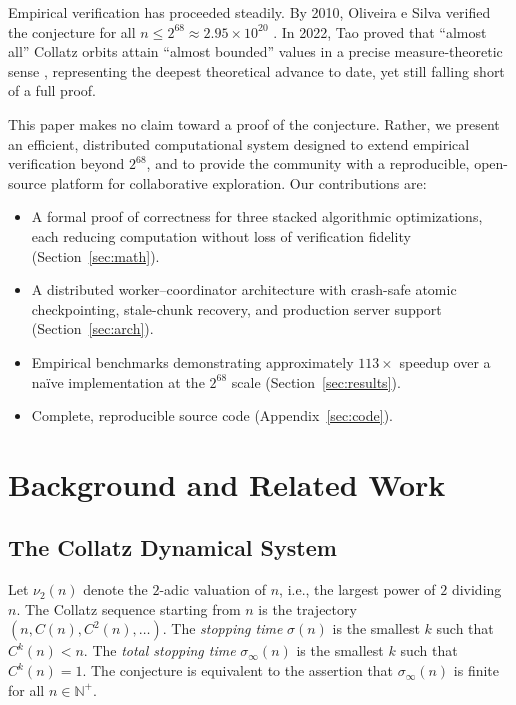 \documentclass{mcom-l}
\theoremstyle{definition}
\theoremstyle{remark}
\numberwithin{equation}{section}
\newcommand{\N}{\mathbb{N}}          %
\newcommand{\vp}{\nu_2}              %
\begin{document}
Empirical verification has proceeded steadily.  By 2010, Oliveira e
Silva verified the conjecture for all $n \leq 2^{68} \approx 2.95
\times 10^{20}$ \cite{OliveiraeSilva2010}.  In 2022, Tao proved that
``almost all'' Collatz orbits attain ``almost bounded'' values in a
precise measure-theoretic sense \cite{Tao2022}, representing the
deepest theoretical advance to date, yet still falling short of a full
proof.

This paper makes no claim toward a proof of the conjecture.  Rather,
we present an efficient, distributed computational system designed to
extend empirical verification beyond $2^{68}$, and to provide the
community with a reproducible, open-source platform for collaborative
exploration.  Our contributions are:
\begin{itemize}
  \item A formal proof of correctness for three stacked algorithmic
        optimizations, each reducing computation without loss of
        verification fidelity (Section~\ref{sec:math}).
  \item A distributed worker--coordinator architecture with crash-safe
        atomic checkpointing, stale-chunk recovery, and production
        server support (Section~\ref{sec:arch}).
  \item Empirical benchmarks demonstrating approximately $113\times$
        speedup over a na\"{i}ve implementation at the $2^{68}$ scale
        (Section~\ref{sec:results}).
  \item Complete, reproducible source code (Appendix~\ref{sec:code}).
\end{itemize}

\section{Background and Related Work}
\label{sec:background}

\subsection{The Collatz Dynamical System}

Let $\vp(n)$ denote the $2$-adic valuation of $n$, i.e., the largest
power of $2$ dividing $n$.  The Collatz sequence starting from $n$ is
the trajectory $(n, C(n), C^2(n), \ldots)$.  The \emph{stopping time}
$\sigma(n)$ is the smallest $k$ such that $C^k(n) < n$.  The
\emph{total stopping time} $\sigma_\infty(n)$ is the smallest $k$ such
that $C^k(n) = 1$.  The conjecture is equivalent to the assertion that
$\sigma_\infty(n)$ is finite for all $n \in \N^+$.
\end{document}

